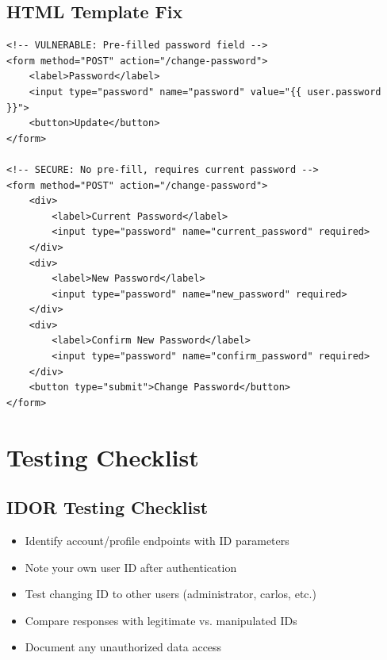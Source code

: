 \documentclass[11pt,letterpaper]{article}
\begin{document}
\subsection{HTML Template Fix}

\begin{listing}[H]
\begin{verbatim}
<!-- VULNERABLE: Pre-filled password field -->
<form method="POST" action="/change-password">
    <label>Password</label>
    <input type="password" name="password" value="{{ user.password }}">
    <button>Update</button>
</form>

<!-- SECURE: No pre-fill, requires current password -->
<form method="POST" action="/change-password">
    <div>
        <label>Current Password</label>
        <input type="password" name="current_password" required>
    </div>
    <div>
        <label>New Password</label>
        <input type="password" name="new_password" required>
    </div>
    <div>
        <label>Confirm New Password</label>
        <input type="password" name="confirm_password" required>
    </div>
    <button type="submit">Change Password</button>
</form>
\end{verbatim}
\caption{Secure password change form template}
\end{listing}

\section{Testing Checklist}

\subsection{IDOR Testing Checklist}

\begin{itemize}[label=$\square$]
  \item Identify account/profile endpoints with ID parameters
  \item Note your own user ID after authentication
  \item Test changing ID to other users (administrator, carlos, etc.)
  \item Compare responses with legitimate vs. manipulated IDs
  \item Document any unauthorized data access
\end{itemize}
\end{document}
